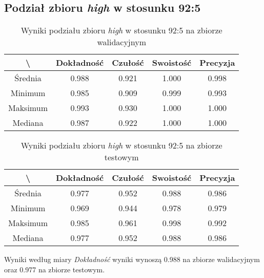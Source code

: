 \subsection{Podział zbioru \textit{high} w stosunku 92:5}


\begin{table}[H]
	\centering
	\caption{Wyniki podziału zbioru \textit{high} w stosunku 92:5 na zbiorze walidacyjnym}
	\vspace{6pt}
	{\footnotesize
		\begin{tabular}{|c|c|c|c|c|}
      \hline \textbackslash & Dokładność & Czułość & Swoistość & Precyzja \\
      \hline Średnia & 0.988 & 0.921 & 1.000 & 0.998 \\
      \hline Minimum & 0.985 & 0.909 & 0.999 & 0.993 \\
      \hline Maksimum & 0.993 & 0.930 & 1.000 & 1.000 \\
      \hline Mediana & 0.987 & 0.922 & 1.000 & 1.000 \\
      \hline
    \end{tabular}
    \label{Tab:highsplita_val}
	}
	\vspace{0pt}
\end{table}

\begin{table}[H]
	\centering
	\caption{Wyniki podziału zbioru \textit{high} w stosunku 92:5 na zbiorze testowym}
	\vspace{6pt}
	{\footnotesize
		\begin{tabular}{|c|c|c|c|c|}
      \hline \textbackslash & Dokładność & Czułość & Swoistość & Precyzja \\
      \hline Średnia & 0.977 & 0.952 & 0.988 & 0.986 \\
      \hline Minimum & 0.969 & 0.944 & 0.978 & 0.979 \\
      \hline Maksimum & 0.985 & 0.961 & 0.998 & 0.992 \\
      \hline Mediana & 0.977 & 0.952 & 0.988 & 0.986 \\
      \hline
    \end{tabular}
    \label{Tab:highsplita_test}
	}
	\vspace{0pt}
\end{table}

Wyniki według miary \textit{Dokładność} wyniki wynoszą 0.988 na zbiorze walidacyjnym oraz 0.977 na zbiorze testowym.
